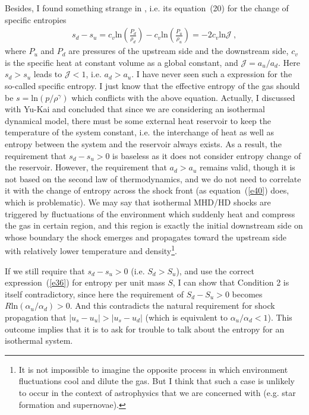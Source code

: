 \documentclass[fleqn,usenatbib]{mnras}
\begin{document}
Besides, I found something strange in \citet{lou2014self}, i.e. its equation~(20) for the change of specific entropies 
\begin{gather}
s_{d}-s_{u}=c_{v}\mathrm{ln}\left(\frac{P_{d}}{\rho_{d}}\right)-c_{v}\mathrm{ln}\left(\frac{P_{u}}{\rho_{u}}\right)=-2c_{v}\mathrm{ln}\mathcal{J}\ ,\label{e40}
\end{gather}
where $P_{u}$ and $P_{d}$ are pressures of the upstream side and the downstream side, $c_{v}$ is the specific heat at constant volume as a global constant, and $\mathcal{J}=a_{u}/a_{d}$. Here $s_{d}>s_{u}$ leads to $\mathcal{J}<1$, i.e. $a_{d}>a_{u}$. I have never seen such a expression for the so-called specific entropy. I just know that the effective entropy of the gas should be $s=\mathrm{ln}(p/\rho^{\gamma})$ which conflicts with the above equation. Actually, I discussed with Yu-Kai and concluded that since we are considering an isothermal dynamical model, there must be some external heat reservoir to keep the temperature of the system constant, i.e. the interchange of heat as well as entropy between the system and the reservoir always exists. As a result, the requirement that $s_{d}-s_{u}>0$ is baseless as it does not consider entropy change of the reservoir. However, the requirement that $a_{d}>a_{u}$ remains valid, though it is not based on the second law of thermodynamics, and we do not need to correlate it with the change of entropy across the shock front (as equation~(\ref{e40}) does, which is problematic). We may say that isothermal MHD/HD shocks are triggered by fluctuations of the environment which suddenly heat and compress the gas in certain region, and this region is exactly the initial downstream side on whose boundary the shock emerges and propagates toward the upstream side with relatively lower temperature and density\footnote{It is not impossible to imagine the opposite process in which environment fluctuations cool and dilute the gas. But I think that such a case is unlikely to occur in the context of astrophysics that we are concerned with (e.g. star formation and supernovae).}.

If we still require that $s_{d}-s_{u}>0$ (i.e. $S_{d}>S_{u}$), and use the correct expression~(\ref{e36}) for entropy per unit mass $S$, I can show that Condition 2 is itself contradictory, since here the requirement of $S_{d}-S_{u}>0$ becomes $R\mathrm{ln}(\alpha_{u}/\alpha_{d})>0$. And this contradicts the natural requirement for shock propagation that $|u_{s}-u_{u}|>|u_{s}-u_{d}|$ (which is equivalent to $\alpha_{u}/\alpha_{d}<1$). This outcome implies that it is to ask for trouble to talk about the entropy for an isothermal system. 
\end{document}
